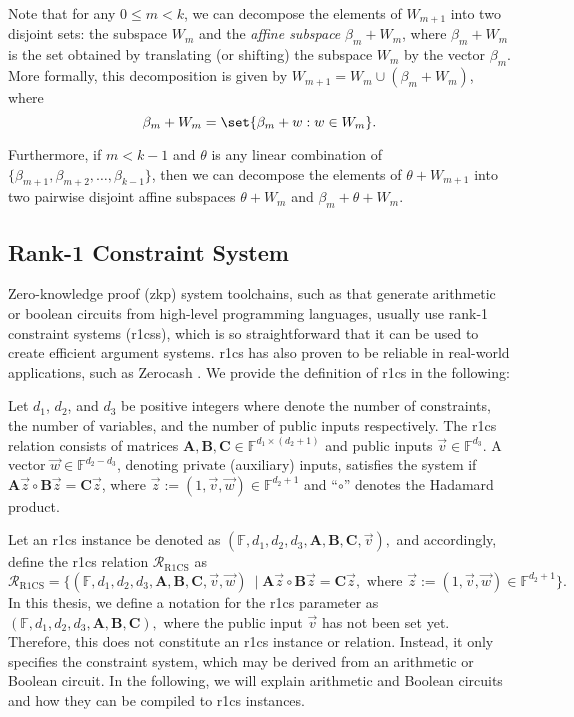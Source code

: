 Note that for any $0 \leq m < k$, we can decompose the elements of $W_{m+1}$ into two disjoint sets: the subspace $W_m$ and the \textit{affine subspace} $\beta_m + W_m$, where $\beta_m + W_m$ is the set obtained by translating (or shifting) the subspace $W_m$ by the vector $\beta_m$. More formally, this decomposition is given by $W_{m+1} = W_m \cup (\beta_m + W_m)$, where \[\beta_m + W_m = \set{\beta_m + w: w \in W_m} .\]

Furthermore, if $m < k-1$ and $\theta$ is any linear combination of $\{\beta_{m+1}, \beta_{m+2}, \ldots, \beta_{k-1}\}$, then we can decompose the elements of $\theta + W_{m+1}$ into two pairwise disjoint affine subspaces $\theta + W_m$ and $\beta_{m} + \theta + W_m$.

\subsection{Rank-1 Constraint System} \label{sec:prel_r1cs}

Zero-knowledge proof (\gls{zkp}) system toolchains, such as \cite{Groth2016, Aurora2019, Chiesa2020Fractal, Ames2017Ligero} that generate arithmetic or boolean circuits from high-level programming languages, usually use rank-1 constraint systems (\gls{r1cs}s), which is so straightforward that it can be used to create efficient argument systems. \gls{r1cs} has also proven to be reliable in real-world applications, such as Zerocash \cite{zcash-proc}. We provide the definition of \gls{r1cs} in the following:

\begin{definition} \label{def:R1CS}
	Let $d_1$, $d_2$, and $d_3$ be positive integers where denote the number of constraints, the number of variables, and the number of public inputs respectively. The \gls{r1cs} relation consists of matrices $\mathbf{A},\mathbf{B},\mathbf{C} \in \mathbb{F}^{d_1\times (d_2+1)}$ and public inputs $\vec{{v}} \in \mathbb{F}^{d_3}$. A vector $\vec{{w}} \in \mathbb{F}^{d_2-d_3}$, denoting private (auxiliary) inputs, satisfies the system if
	\(
	\mathbf{A}\vec{{z}} \circ \mathbf{B}\vec{{z}} = \mathbf{C}\vec{{z}}
	\), 
	where $\vec{z}:=(1,\vec{v},\vec{w}) \in \mathbb{F}^{d_2+1}$ and “$\circ$” denotes the Hadamard product.
\end{definition}
Let an \gls{r1cs} instance be denoted as 
\(
(\mathbb{F}, d_1, d_2, d_3, \mathbf{A}, \mathbf{B}, \mathbf{C}, \vec{v}),
\)
and accordingly, define the \gls{r1cs} relation $\mathcal{R}_{\text{R1CS}}$ as   
\[
\mathcal{R}_{\text{R1CS}} = \{(\mathbb{F}, d_1, d_2, d_3, \mathbf{A}, \mathbf{B}, \mathbf{C}, \vec{v}, \vec{w})\ \mid  \mathbf{A}\vec{{z}} \circ \mathbf{B}\vec{{z}} = \mathbf{C}\vec{{z}}, \text{ where } \vec{z}:=(1,\vec{v},\vec{w}) \in \mathbb{F}^{d_2+1}\}.
\]
In this thesis, we define a notation for the \gls{r1cs} parameter as 
\(
(\mathbb{F}, d_1, d_2, d_3, \mathbf{A}, \mathbf{B}, \mathbf{C}),
\)
where the public input \(\vec{v}\) has not been set yet. Therefore, this does not constitute an \gls{r1cs} instance or relation. Instead, it only specifies the constraint system, which may be derived from an arithmetic or Boolean circuit. In the following, we will explain arithmetic and Boolean circuits and how they can be compiled to \gls{r1cs} instances.


